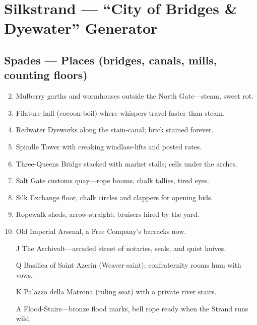 \chapter{Silkstrand --- ``City of Bridges \& Dyewater'' Generator}
\label{chap:silkstrand}

\section*{Spades --- Places (bridges, canals, mills, counting floors)}
\label{sec:silkstrand-places}
\begin{enumerate}
\setcounter{enumi}{1}
\item Mulberry garths and wormhouses outside the North Gate---steam, sweet rot.
\item Filature hall (cocoon-boil) where whispers travel faster than steam.
\item Redwater Dyeworks along the stain-canal; brick stained forever.
\item Spindle Tower with creaking windlass-lifts and posted rates.
\item Three-Queens Bridge stacked with market stalls; cells under the arches.
\item Salt Gate customs quay---rope booms, chalk tallies, tired eyes.
\item Silk Exchange floor, chalk circles and clappers for opening bids.
\item Ropewalk sheds, arrow-straight; bruisers hired by the yard.
\item Old Imperial Arsenal, a Free Company's barracks now.
\item[J] The Archivolt---arcaded street of notaries, seals, and quiet knives.
\item[Q] Basilica of Saint Azerin (Weaver-saint); confraternity rooms hum with vows.
\item[K] Palazzo della Matrona (ruling seat) with a private river stairs.
\item[A] Flood-Stairs---bronze flood marks, bell rope ready when the Strand runs wild.
\end{enumerate}

